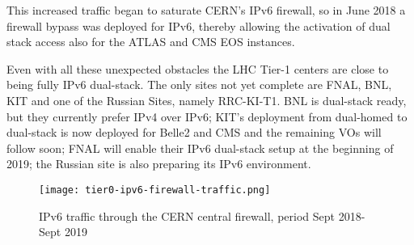 This increased traffic began to saturate CERN's IPv6 firewall, so in June 2018 a
firewall bypass was deployed for IPv6,
thereby allowing the activation of dual stack access also for the ATLAS and CMS EOS instances.    
 

Even with all these unexpected obstacles the LHC Tier-1 centers are close to being fully IPv6 dual-stack. The only sites not yet complete are FNAL, BNL, KIT and one of the Russian Sites, namely RRC-KI-T1. 
BNL is dual-stack ready, but they currently prefer IPv4 over IPv6; KIT's deployment from dual-homed to dual-stack is now deployed for Belle2 and CMS and the remaining VOs will follow soon; 
FNAL will enable their IPv6 dual-stack setup at the beginning of 2019; the Russian site is also preparing its IPv6 environment.



\begin{figure}[h!]
\centering
\texttt{[image: tier0-ipv6-firewall-traffic.png]}
\caption{IPv6 traffic through the CERN central firewall, period Sept 2018-Sept 2019}
\label{fig:tier0-traffic}
\end{figure}
